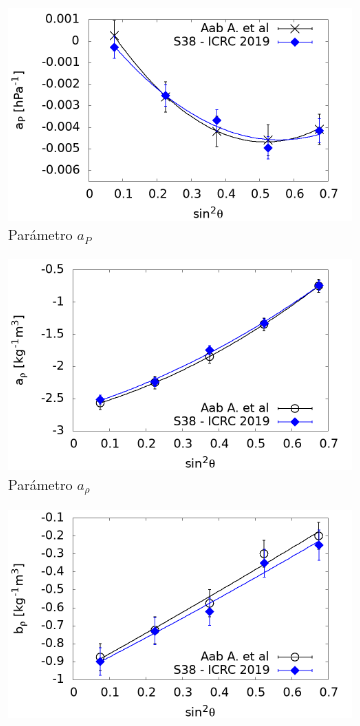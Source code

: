             \begin{figure}[H]
                \begin{subfigure}[b]{0.5\textwidth}
                \includegraphics[width=\linewidth]{Graphs/params/ap_ICRC_2019_S38_above_0EeV.png}
                \caption{Parámetro $a_P$ }
                \label{fig:ap_2019_S38}
                \end{subfigure}%
                \hspace{\fill}
                \begin{subfigure}[b]{0.5\textwidth}
                \includegraphics[width=\linewidth]{Graphs/params/arho_ICRC_2019_S38_above_0EeV.png}
                \caption{Parámetro $a_{\rho}$ }
                \label{fig:arho_2019_S38}
                \end{subfigure}%
                \hspace{\fill}
                \begin{subfigure}[b]{\textwidth}
                \centering
                \includegraphics[width=0.5\linewidth]{Graphs/params/brho_ICRC_2019_S38_above_0EeV.png}

\end{subfigure}
\end{figure}
